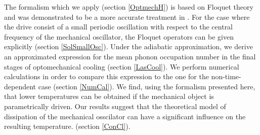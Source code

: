 \documentclass[reprint, amsmath,amssymb, aps,pra]{revtex4-1}
\begin{document}
The formalism which we apply (section \ref{OptmechH}) is based on
Floquet theory and was demonstrated to be a more accurate treatment in
\cite{HanngiFM}. For the case where the drive consist of a small
periodic oscillation with respect to the central frequency of the
mechanical oscillator, the Floquet operators can be given explicitly
(section \ref{SolSmallOsc}). Under the adiabatic approximation, we
derive an approximated expression for the
mean phonon occupation number in the final stages of optomechanical cooling (section \ref{LasCool}). We perform numerical
calculations in order to compare this expression to the one for the
non-time-dependent case (section \ref{NumCal}). We find, using the
formalism  presented here, that lower temperatures can be obtained if
the mechanical object is parametrically driven. Our results suggest
that the theoretical model of dissipation of the mechanical osscilator
can have a significant influence on the resulting temperature. (section \ref{ConCl}).




\end{document}

